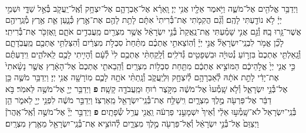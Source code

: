 \documentclass[twoside, openany, parskip=half, 11pt]{book}
\begin{document}
\begin{footnotesize}
\begin{multicols}{2}
\\
וַיְדַבֵּ֥ר אֱלֹהִ֖ים אֶל־מֹשֶׁ֑ה וַיֹּ֥אמֶר אֵלָ֖יו אֲנִ֥י יְיָ׃ וָֽאֵרָ֗א אֶל־אַבְרָהָ֛ם אֶל־יִצְחָ֥ק וְ֯אֶֽל־יַֽעֲקֹ֖ב בְּ֯אֵ֣ל שַׁדָּ֑י וּשְׁמִ֣י יְיָ֔ לֹ֥א נוֹדַ֖עְתִּי לָהֶֽם׃ וְ֯גַ֨ם הֲקִמֹ֤תִי אֶת־בְּ֯רִיתִי֙ אִתָּ֔ם לָתֵ֥ת לָהֶ֖ם אֶת־אֶ֣רֶץ כְּ֯נָ֑עַן אֵ֛ת אֶ֥רֶץ מְ֯גֻֽרֵיהֶ֖ם אֲשֶׁר־גָּ֥רוּ בָֽהּ׃ וְ֯גַ֣ם אֲנִ֣י שָׁמַ֗עְתִּי אֶֽת־נַֽאֲקַת֙ בְּ֯נֵ֣י יִשְׂרָאֵ֔ל אֲשֶׁ֥ר מִצְרַ֖יִם מַֽעֲבִדִ֣ים אֹתָ֑ם וָֽאֶזְכֹּ֖ר אֶת־בְּ֯רִיתִֽי׃  לָכֵ֞ן אֱמֹ֥ר לִבְנֵֽי־יִשְׂרָאֵל֘ אֲנִ֣י יְיָ֒ וְ֯הֽוֹצֵאתִ֣י אֶתְכֶ֗ם מִתַּ֨חַת֙ סִבְלֹ֣ת מִצְרַ֔יִם וְ֯הִצַּלְתִּ֥י אֶתְכֶ֖ם מֵֽעֲבֹֽדָתָ֑ם וְ֯גָֽאַלְתִּ֤י אֶתְכֶם֙ בִּזְר֣וֹעַ נְ֯טוּיָ֔ה וּבִשְׁפָטִ֖ים גְּ֯דֹלִֽים׃ וְ֯לָֽקַחְתִּ֨י אֶתְכֶ֥ם לִי֙ לְ֯עָ֔ם וְ֯הָיִ֥יתִי לָכֶ֖ם לֵֽאלֹהִ֑ים וִֽידַעְתֶּ֗ם כִּ֣י אֲנִ֤י יְיָ֙ אֱלֹ֣הֵיכֶ֔ם הַמּוֹצִ֣יא אֶתְכֶ֔ם מִתַּ֖חַת סִבְל֥וֹת מִצְרָֽיִם׃ וְ֯הֵֽבֵאתִ֤י אֶתְכֶם֙ אֶל־הָאָ֔רֶץ אֲשֶׁ֤ר נָשָׂ֨אתִי֙ אֶת־יָדִ֔י לָתֵ֣ת אֹתָ֔הּ לְ֯אַבְרָהָ֥ם לְ֯יִצְחָ֖ק וּֽלְיַֽעֲקֹ֑ב וְ֯נָֽתַתִּ֨י אֹתָ֥הּ לָכֶ֛ם מֽוֹרָשָׁ֖ה אֲנִ֥י יְיָ׃ וַיְדַבֵּ֥ר מֹשֶׁ֛ה כֵּ֖ן אֶל־בְּ֯נֵ֣י יִשְׂרָאֵ֑ל וְ֯לֹ֤א שָֽׁמְ֯עוּ֙ אֶל־מֹשֶׁ֔ה מִקֹּ֣צֶר ר֔וּחַ וּמֵֽעֲבֹדָ֖ה קָשָֽׁה׃ \textbf{פ}
וַיְדַבֵּ֥ר יְיָ֖ אֶל־מֹשֶׁ֥ה לֵּאמֹֽר׃ בֹּ֣א דַבֵּ֔ר אֶל־פַּרְעֹ֖ה מֶ֣לֶךְ מִצְרָ֑יִם וִֽישַׁלַּ֥ח אֶת־בְּ֯נֵֽי־יִשְׂרָאֵ֖ל מֵֽאַרְצֽוֹ׃ וַיְדַבֵּ֣ר מֹשֶׁ֔ה לִפְנֵ֥י יְיָ֖ לֵאמֹ֑ר הֵ֤ן בְּ֯נֵֽי־יִשְׂרָאֵל֙ לֹא־שָֽׁמְ֯ע֣וּ אֵלַ֔י וְ֯אֵיךְ֙ יִשְׁמָעֵ֣נִי פַרְעֹ֔ה וַֽאֲנִ֖י עֲרַ֥ל שְׂ֯פָתָֽיִם׃ \textbf{פ}
וַיְדַבֵּ֣ר יְיָ֘ אֶל־מֹשֶׁ֣ה וְ֯אֶֽל־אַֽהֲרֹן֒ וַיְצַוֵּם֙ אֶל־בְּ֯נֵ֣י יִשְׂרָאֵ֔ל וְ֯אֶל־פַּרְעֹ֖ה מֶ֣לֶךְ מִצְרָ֑יִם לְ֯הוֹצִ֥יא אֶת־בְּ֯נֵֽי־יִשְׂרָאֵ֖ל מֵאֶ֥רֶץ מִצְרָֽיִם׃


\end{multicols}
\end{footnotesize}
\end{document}
